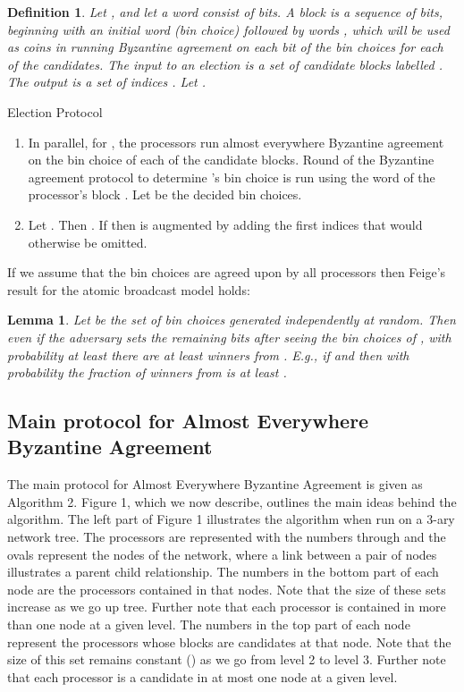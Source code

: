 \documentclass[letterpaper,11pt]{article}
\newtheorem{lemma}{Lemma}
\newtheorem{definition}{Definition}
\begin{document}
\begin{definition}
Let , and let a \emph{word} consist of  bits.  A {\it block}  is a sequence of bits, beginning with an initial word (bin choice)  followed by  words , which will be used as coins in running Byzantine agreement on each bit of the bin choices for each of the  candidates.  The input to an election is a set of  candidate blocks labelled . The output is 
a set of  indices .  Let .
  
 \end{definition}

\begin{algorithm}\label{a:ep}
\caption{Election Protocol}
\begin{enumerate}
\item In parallel, for , the processors run almost everywhere Byzantine agreement on the bin choice of each of the  candidate blocks.  Round   of the Byzantine agreement protocol to determine  's bin choice  is run  using the  word of the   processor's block .   Let  be the decided bin choices.
\item
Let  . Then   .
If  then  is augmented by adding the first   indices that would otherwise be omitted. 
\end{enumerate} 
\end{algorithm}

If we assume that the bin choices are agreed upon by all processors then Feige's result for the atomic broadcast model holds:

\begin{lemma} \cite{Feige} \label{Feige}
Let  be the set of bin choices generated independently at random. Then even if the adversary sets the remaining bits after seeing the bin choices of , with probability at least   there are at least    winners from .  E.g., if   and
  then with probability  the fraction of winners from  is at least . 
\end{lemma}


\subsection{Main protocol for Almost Everywhere Byzantine Agreement}\label{main}

The main protocol for Almost Everywhere Byzantine Agreement is given as Algorithm 2.  Figure 1, which we now describe, outlines the main ideas behind the algorithm.  The left part of Figure 1 illustrates the algorithm when run on a 3-ary network tree.  The processors are represented with the numbers  through  and the ovals represent the nodes of the network, where a link between a pair of nodes illustrates a parent child relationship.  The numbers in the bottom part of each node are the processors contained in that nodes.  Note that the size of these sets increase as we go up tree.  Further note that each processor is contained in more than one node at a given level.  The numbers in the top part of each node represent the processors whose blocks are candidates at that node.  Note that the size of this set remains constant () as we go from level 2 to level 3.  Further note that each processor is a candidate in at most one node at a given level.
\end{document}

